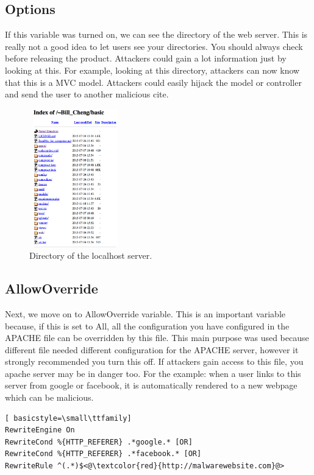 \documentclass[conference]{IEEEtran}
\begin{document}
\subsection{Options}
If this variable was turned on, we can see the directory of the web server. This is really not a good idea to let users see your directories. You should always check before releasing the product. Attackers could gain a lot information just by looking at this. For example, looking at this directory, attackers can now know that this is a MVC model. Attackers could easily hijack the model or controller and send the user to another malicious cite.
\begin{figure}[h]
\includegraphics[width=4cm, height=6cm]{options_none}
\centering
\caption{Directory of the localhost server.}
\end{figure}

\subsection{AllowOverride}
Next, we move on to AllowOverride variable. This is an important variable because, if this is set to All, all the configuration you have configured in the APACHE file can be overridden by this file. This main purpose was used because different file needed different configuration for the APACHE server, however it strongly recommended you turn this off. If attackers gain access to this file, you apache server may be in danger too.  For the example: when a user links to this server from google or facebook, it is automatically rendered to a new webpage which can be malicious.

\begin{lstlisting}[ basicstyle=\small\ttfamily]
RewriteEngine On
RewriteCond %{HTTP_REFERER} .*google.* [OR]
RewriteCond %{HTTP_REFERER} .*facebook.* [OR]
RewriteRule ^(.*)$<@\textcolor{red}{http://malwarewebsite.com}@>
\end{lstlisting}
\end{document}
